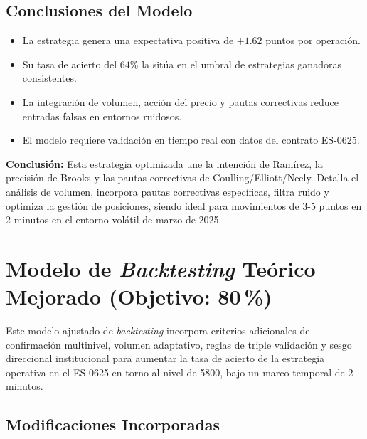 \subsection{Conclusiones del Modelo}

\begin{itemize}
    \item La estrategia genera una expectativa positiva de $+1.62$ puntos por operaci\'on.
    \item Su tasa de acierto del $64\%$ la sit\'ua en el umbral de estrategias ganadoras consistentes.
    \item La integraci\'on de volumen, acci\'on del precio y pautas correctivas reduce entradas falsas en entornos ruidosos.
    \item El modelo requiere validaci\'on en tiempo real con datos del contrato ES-0625.
\end{itemize}


\textbf{Conclusi\'{o}n:} Esta estrategia optimizada une la intenci\'{o}n de Ram\'irez, la precisi\'{o}n de Brooks y las pautas correctivas de Coulling/Elliott/Neely. Detalla el an\'alisis de volumen, incorpora pautas correctivas espec\'ificas, filtra ruido y optimiza la gesti\'on de posiciones, siendo ideal para movimientos de 3-5 puntos en 2 minutos en el entorno vol\'{a}til de marzo de 2025.

\section{Modelo de \textit{Backtesting} Te\'{o}rico Mejorado (Objetivo: 80\,\%)}

Este modelo ajustado de \textit{backtesting} incorpora criterios adicionales de confirmaci\'on multinivel, volumen adaptativo, reglas de triple validaci\'on y sesgo direccional institucional para aumentar la tasa de acierto de la estrategia operativa en el ES-0625 en torno al nivel de 5800, bajo un marco temporal de 2 minutos.

\subsection{Modificaciones Incorporadas}

